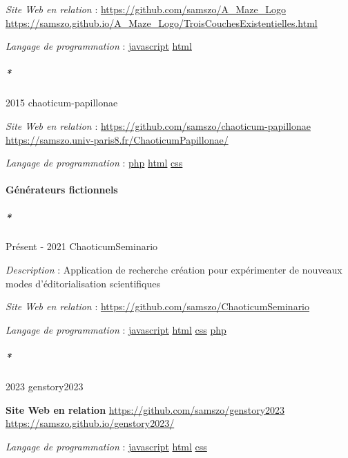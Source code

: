 \documentclass[
  a4paper,
  DIV=11,
  numbers=noendperiod]{scrreprt}
\let\oldparagraph\paragraph
\renewcommand{\paragraph}[1]{\oldparagraph{#1}\mbox{}}
\let\oldsubparagraph\subparagraph
\renewcommand{\subparagraph}[1]{\oldsubparagraph{#1}\mbox{}}
\begin{document}
\emph{Site Web en relation} :
\url{https://github.com/samszo/A_Maze_Logo}
\url{https://samszo.github.io/A_Maze_Logo/TroisCouchesExistentielles.html}

\emph{Langage de programmation} :
\href{http://localhost/samszo/omk/s/fiches/item/89711}{javascript}
\href{http://localhost/samszo/omk/s/fiches/item/96621}{html}

\subparagraph*{2015 chaoticum-papillonae}\label{sec-item299749}

\emph{Site Web en relation} :
\url{https://github.com/samszo/chaoticum-papillonae}
\url{https://samszo.univ-paris8.fr/ChaoticumPapillonae/}

\emph{Langage de programmation} :
\href{http://localhost/samszo/omk/s/fiches/item/108369}{php}
\href{http://localhost/samszo/omk/s/fiches/item/96621}{html}
\href{http://localhost/samszo/omk/s/fiches/item/102418}{css}

\paragraph{Générateurs fictionnels}\label{guxe9nuxe9rateurs-fictionnels}

\subparagraph*{Présent - 2021 ChaoticumSeminario}\label{sec-item299712}

\emph{Description} : Application de recherche création pour expérimenter
de nouveaux modes d'éditorialisation scientifiques

\emph{Site Web en relation} :
\url{https://github.com/samszo/ChaoticumSeminario}

\emph{Langage de programmation} :
\href{http://localhost/samszo/omk/s/fiches/item/89711}{javascript}
\href{http://localhost/samszo/omk/s/fiches/item/96621}{html}
\href{http://localhost/samszo/omk/s/fiches/item/102418}{css}
\href{http://localhost/samszo/omk/s/fiches/item/108369}{php}

\subparagraph*{2023 genstory2023}\label{sec-item301873}

\textbf{Site Web en relation}
\url{https://github.com/samszo/genstory2023}
\url{https://samszo.github.io/genstory2023/}

\emph{Langage de programmation} :
\href{http://localhost/samszo/omk/s/fiches/item/89711}{javascript}
\href{http://localhost/samszo/omk/s/fiches/item/96621}{html}
\href{http://localhost/samszo/omk/s/fiches/item/102418}{css}
\end{document}

